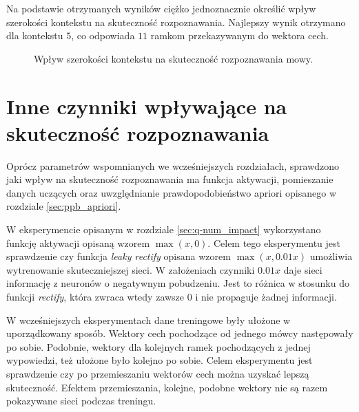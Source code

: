 \documentclass[shortabstract, mgr]{iithesis}
\begin{document}
		Na podstawie otrzymanych wyników ciężko jednoznacznie określić wpływ szerokości kontekstu na skuteczność rozpoznawania. Najlepszy wynik otrzymano dla kontekstu $5$, co odpowiada $11$ ramkom przekazywanym do wektora cech.
		
		\begin{figure}[H]
			\centering
			\label{fig:fig_ctx_impact}
			\caption{Wpływ szerokości kontekstu na skuteczność rozpoznawania mowy.}
		\end{figure}

	\section{ Inne czynniki wpływające na skuteczność rozpoznawania }
		\label{sec:impact_other}
		Oprócz parametrów wspomnianych we wcześniejszych rozdziałach, sprawdzono jaki wpływ na skuteczność rozpoznawania ma funkcja aktywacji, pomieszanie danych uczących oraz uwzględnianie prawdopodobieństwo apriori opisanego w rozdziale \ref{sec:ppb_apriori}.
		
		W eksperymencie opisanym w rozdziale \ref{sec:q-num_impact} wykorzystano funkcję aktywacji opisaną wzorem $\max(x,0)$. Celem tego eksperymentu jest sprawdzenie czy funkcja \textit{leaky rectify} opisana wzorem $\max(x, 0.01x)$ umożliwia wytrenowanie skuteczniejszej sieci. W założeniach czynniki $0.01x$ daje sieci informację z neuronów o negatywnym pobudzeniu. Jest to różnica w stosunku do funkcji \textit{rectify}, która zwraca wtedy zawsze $0$ i nie propaguje żadnej informacji. 
		
		W wcześniejszych eksperymentach dane treningowe były ułożone w uporządkowany sposób. Wektory cech pochodzące od jednego mówcy następowały po sobie. Podobnie, wektory dla kolejnych ramek pochodzących z jednej wypowiedzi, też  ułożone było kolejno po sobie. Celem eksperymentu jest sprawdzenie czy po przemieszaniu wektorów cech można uzyskać lepszą skuteczność. Efektem przemieszania, kolejne, podobne wektory nie są razem pokazywane sieci podczas treningu.
		
\end{document}

